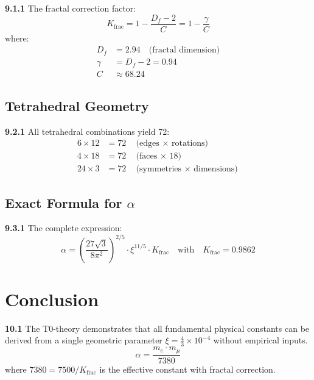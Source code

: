 \documentclass[12pt,a4paper]{article}
\newcommand{\xipar}{\xi}
\begin{document}
\noindent \textbf{9.1.1} The fractal correction factor:
\begin{equation}
	\boxed{K_{\text{frac}} = 1 - \frac{D_f - 2}{C} = 1 - \frac{\gamma}{C}}
\end{equation}
where:
\begin{align}
	D_f &= 2.94 \quad \text{(fractal dimension)} \\
	\gamma &= D_f - 2 = 0.94 \\
	C &\approx 68.24
\end{align}

\subsection{Tetrahedral Geometry}

\begin{tcolorbox}[colback=yellow!5!white,colframe=red!75!black,title=Amazing Discovery]
	\noindent \textbf{9.2.1} All tetrahedral combinations yield 72:
	\begin{align}
		6 \times 12 &= 72 \quad \text{(edges $\times$ rotations)} \\
		4 \times 18 &= 72 \quad \text{(faces $\times$ 18)} \\
		24 \times 3 &= 72 \quad \text{(symmetries $\times$ dimensions)}
	\end{align}
\end{tcolorbox}

\subsection{Exact Formula for $\alpha$}

\noindent \textbf{9.3.1} The complete expression:
\begin{equation}
	\boxed{\alpha = \left( \frac{27 \sqrt{3}}{8 \pi^2} \right)^{2/5} \cdot \xipar^{11/5} \cdot K_{\text{frac}}}
	\quad \text{with} \quad K_{\text{frac}} = 0.9862
\end{equation}

\section{Conclusion}

\begin{tcolorbox}[colback=green!5,colframe=green!75!black,title=Central Result]
	\noindent \textbf{10.1} The T0-theory demonstrates that all fundamental physical constants can be derived from a single geometric parameter $\xipar = \frac{4}{3} \times 10^{-4}$ without empirical inputs.
	\begin{equation}
		\boxed{\alpha = \frac{m_e \cdot m_\mu}{7380}}
	\end{equation}
	where $7380 = 7500 / K_{\text{frac}}$ is the effective constant with fractal correction.
\end{tcolorbox}
\end{document}
